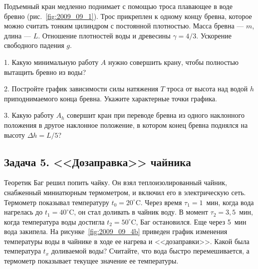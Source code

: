 Подъемный кран медленно поднимает с помощью троса плавающее в воде
бревно (рис.~\ref{fig:2009_09_1}). Трос прикреплен к одному концу
бревна, которое можно считать тонким цилиндром с постоянной
плотностью. Масса бревна --- $m$, длина --- $L$. Отношение плотностей
воды и древесины $\gamma=4/3$. Ускорение свободного падения $g$.

1. Какую минимальную работу $A$ нужно совершить крану, чтобы полностью
вытащить бревно из воды?

2. Постройте график зависимости силы натяжения $T$ троса от высота над
водой $h$ приподнимаемого конца бревна. Укажите характерные точки
графика.

3. Какую работу $A_h$ совершит кран при переводе бревна из одного
наклонного положения в другое наклонное положение, в котором конец
бревна поднялся на высоту $\Delta h=L/5$?



\subsection*{Задача 5. <<Дозаправка>> чайника}

Теоретик Баг решил попить чайку. Он взял теплоизолированный чайник,
снабженный миниатюрным термометром, и включил его в электрическую
сеть. Термометр показывал температуру $t_0=20^\circ$C. Через время
$\tau_1=1$~мин, когда вода нагрелась до $t_1=40^\circ$C, он стал
доливать в чайник воду. В момент $\tau_2=3{,}5$~мин, когда температура
воды достигла $t_2=50^\circ$C, Баг остановился. Еще через 5~мин вода
закипела. На рисунке~\ref{fig:2009_09_4b} приведен график изменения
температуры воды в чайнике в ходе ее нагрева и <<дозаправки>>. Какой
была температура $t_x$ доливаемой воды? Считайте, что вода быстро
перемешивается, а термометр показывает текущее значение ее
температуры.


